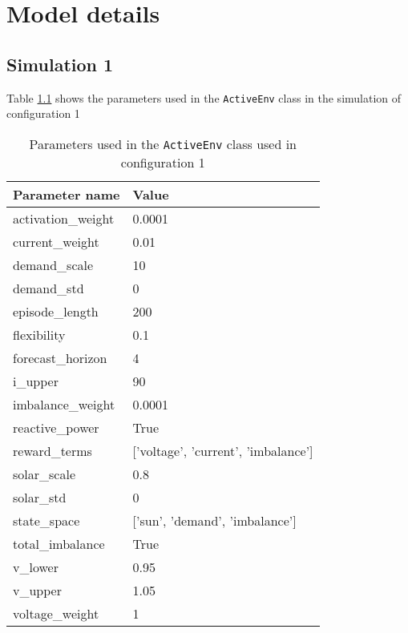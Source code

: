 \documentclass[class=book, crop=false, 11pt]{standalone}
\begin{document}
\chapter{Model details}
\section{Simulation 1}\label{section:apendix_config1}
Table \ref{apendix:config1:params} shows the parameters used in the \texttt{ActiveEnv} class in the simulation of configuration 1

\begin{table}[ht]
\center
\caption{Parameters used in the \texttt{ActiveEnv} class used in configuration 1}
\begin{tabular}{ll}
Parameter name     & Value                                     \\
\hline
activation\_weight & 0.0001                                    \\
current\_weight    & 0.01                                      \\
demand\_scale      & 10                                        \\
demand\_std        & 0                                         \\
episode\_length    & 200                                       \\
flexibility        & 0.1                                       \\
forecast\_horizon  & 4                                         \\
i\_upper           & 90                                        \\
imbalance\_weight  & 0.0001                                    \\
reactive\_power    & True                                     \\
reward\_terms      & {[}'voltage',  'current',  'imbalance'{]} \\
solar\_scale       & 0.8                                       \\
solar\_std         & 0                                         \\
state\_space       & {[}'sun', 'demand',  'imbalance'{]}       \\
total\_imbalance   & True                                      \\
v\_lower           & 0.95                                      \\
v\_upper           & 1.05                                      \\
voltage\_weight    & 1                                         \\
\hline
\end{tabular}
\label{apendix:config1:params}
\end{table}
\end{document}
